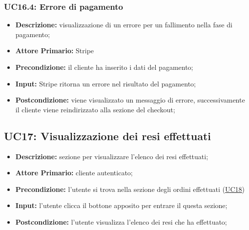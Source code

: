             \subsubsection{UC16.4: Errore di pagamento}
            \label{sec:UC16.4}
                \begin{itemize}
                    \item \textbf{Descrizione:} visualizzazione di un errore per un fallimento nella fase di pagamento;
                    \item \textbf{Attore Primario:} Stripe
                    \item \textbf{Precondizione:} il cliente ha inserito i dati del pagamento;
                    \item \textbf{Input:} Stripe ritorna un errore nel risultato del pagamento;
                    \item \textbf{Postcondizione:} viene visualizzato un messaggio di errore, successivamente il cliente viene reindirizzato alla sezione del checkout;
                \end{itemize}


        \subsection{UC17: Visualizzazione dei resi effettuati}
            \begin{itemize}
                \item \textbf{Descrizione:} sezione per visualizzare l'elenco dei resi effettuati;
                \item \textbf{Attore Primario:} cliente autenticato;
                \item \textbf{Precondizione:} l'utente si trova nella sezione degli ordini effettuati (\hyperref[sec:UC18]{\underline{UC18}})
                \item \textbf{Input:} l'utente clicca il bottone apposito per entrare il questa sezione;
                \item \textbf{Postcondizione:} l'utente visualizza l'elenco dei resi che ha effettuato;
            \end{itemize}


